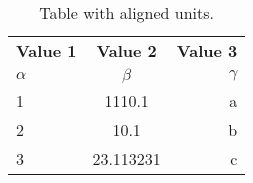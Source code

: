 \documentclass{article}
\begin{document}
	
	\begin{table}[h!]
		\begin{center}
			\caption{Table with aligned units.}
			\label{tab:table1}
			\begin{tabular}{l|c|r}
				\textbf{Value 1} & \textbf{Value 2} &
				\textbf{Value 3}\\
				$\alpha$ & $\beta$ & $\gamma$ \\
				\hline
				1 & 1110.1 & a\\
				2 & 10.1 & b\\
				3 & 23.113231 & c\\
			\end{tabular}
		\end{center}
	\end{table}
\end{document}
